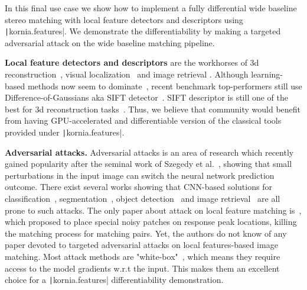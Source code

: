
In this final use case we show how to implement a fully differential wide baseline stereo matching with local feature detectors and descriptors using \texttt|kornia.features|. We demonstrate the differentiability by making a targeted adversarial attack on the wide baseline matching pipeline.

\textbf{Local feature detectors and descriptors} are the workhorses of 3d reconstruction~\citep{schonberger2016structure, torii2018structure}, visual localization~\citep{sarlin2019coarse} and image retrieval \citep{shen2018matchable}. Although learning-based methods now seem to dominate~\citep{LocaFeaturesReview2018}, recent benchmark top-performers still use Difference-of-Gaussians aka SIFT detector~\citep{CVPRW2019}. SIFT descriptor is still one of the best for 3d reconstruction tasks~\citep{ColmapBenchmark2017}. Thus, we believe that community would benefit from having GPU-accelerated and differentiable version of the classical tools provided under \texttt|kornia.features|.

\textbf{Adversarial attacks.}
Adversarial attacks is an area of research which recently gained popularity after the seminal work of Szegedy et al.~\citep{AdvAttack2014}, showing that small perturbations in the input image can switch the neural network prediction outcome. There exist several  works showing that CNN-based solutions for classification~\citep{NIPS2018Adv}, segmentation~\citep{arnab_cvpr_2018}, object detection~\citep{ObjDetAdv2018} and image retrieval~\citep{AdvRetrieval2019}   are all prone to such attacks. 
The only paper about attack on local feature matching is~\citep{adversarial_attack_local_features2019l}, which proposed to place special noisy patches on response peak locations, killing the matching process for matching pairs. Yet, the authors do not know of any paper devoted to targeted adversarial attacks on local features-based image matching. 
Most attack methods are "white-box"~\citep{NIPS2018Adv}, which means they require access to the model gradients w.r.t the input. This makes them an excellent choice for a \texttt|kornia.features| differentiability demonstration.

